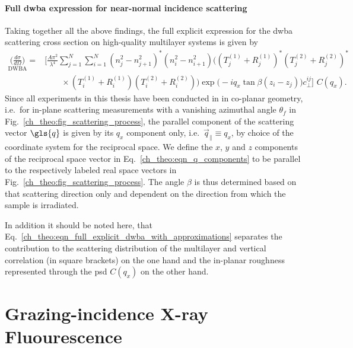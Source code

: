 \paragraph{Full \gls{dwba} expression for near-normal incidence scattering}
Taking together all the above findings, the full explicit expression for the \gls{dwba} scattering cross section on high-quality multilayer systems is given by
    \begin{align}
        {\underset{\text{DWBA}}{\Big(\frac{d \sigma}{d \Omega}\Big)}} = &\Bigg[\frac{A \pi^2}{\lambda^4}\sum \limits_{j=1}^{N}\sum \limits_{i=1}^{N} (n_j^2 - n_{j+1}^2)^* (n_i^2 - n_{i+1}^2)\Big( (T^{(1)}_j + R^{(1)}_j)^* (T^{(2)}_j + R^{(2)}_j)^* \nonumber \\ &\qquad\times(T^{(1)}_i + R^{(1)}_i) (T^{(2)}_i + R^{(2)}_i) \Big) \exp\Big(-i q_x \tan \beta (z_i-z_j)\Big) c_\perp^{i j}\Bigg]\,\, C(q_x) \text{.} \label{ch_theo:eqn_full_explicit_dwba_with_approximations}
    \end{align}
Since all experiments in this thesis have been conducted in in co-planar geometry, i.e.~for in-plane scattering measurements with a vanishing azimuthal angle $\theta_f$ in Fig.~\ref{ch_theo:fig_scattering_process}, the parallel component of the scattering vector $\gls{q}$ is given by its $q_x$ component only, i.e.~$\vec{q}_\parallel \equiv q_x$, by choice of the coordinate system for the reciprocal space. We define the $x$, $y$ and $z$ components of the reciprocal space vector in Eq.~\eqref{ch_theo:eqn_q_components} to be parallel to the respectively labeled real space vectors in Fig.~\ref{ch_theo:fig_scattering_process}. The angle $\beta$ is thus determined based on that scattering direction only and dependent on the direction from which the sample is irradiated.

In addition it should be noted here, that Eq.~\eqref{ch_theo:eqn_full_explicit_dwba_with_approximations} separates the contribution to the scattering distribution of the multilayer and vertical correlation (in square brackets) on the one hand and the in-planar roughness represented through the \gls{psd} $C(q_x)$ on the other hand.

\section{Grazing-incidence X-ray Fluourescence}
\cite{sherman_theoretical_1955, shiraiwa_theoretical_1966, de_boer_glancing-incidence_1991}